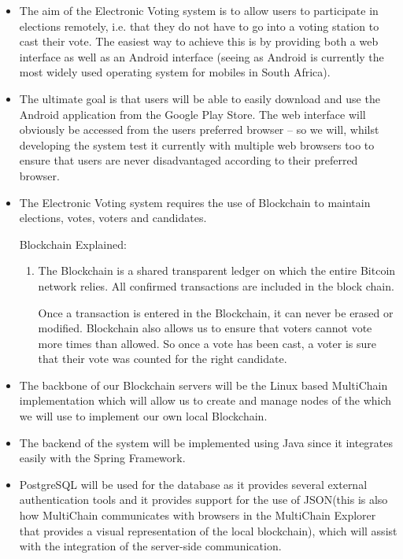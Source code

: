 \begin{itemize}
		\item The aim of the Electronic Voting system is to allow users to participate in elections remotely, i.e. that they do not have to go into a voting station to cast their vote. The easiest way to achieve this is by providing both a web interface as well as an Android interface (seeing as Android is currently the most widely used operating system for mobiles in South Africa). 
		
		\item The ultimate goal is that users will be able to easily download and use the Android application from the Google Play Store. The web interface will obviously be accessed from the users preferred browser – so we will, whilst developing the system test it currently with multiple web browsers too to ensure that users are never disadvantaged according to their preferred browser.  
		
		\item The Electronic Voting system requires the use of Blockchain to maintain elections, votes, voters and candidates. \newline 
		
		Blockchain Explained: 
		\begin{enumerate}
			\item[] The Blockchain is a shared transparent ledger on which the entire Bitcoin network relies. All confirmed transactions are included in the block chain. 
			
			Once a transaction is entered in the Blockchain, it can never be erased or modified. Blockchain also allows us to ensure that voters cannot vote more times than allowed. So once a vote has been cast, a voter is sure that their vote was counted for the right candidate. 
		\end{enumerate}
		
		\item The backbone of our Blockchain servers will be the Linux based MultiChain implementation which will allow us to create and manage nodes of the which we will use to implement our own local Blockchain. 
		
		\item The backend of the system will be implemented using Java since it integrates easily with the Spring Framework.   			
		
		\item PostgreSQL will be used for the database as it provides several external authentication tools and it provides support for the use of JSON(this is also how MultiChain communicates with browsers in the MultiChain Explorer that provides a visual representation of the local blockchain), which will assist with the integration of the server-side communication. 
		

\end{itemize}
